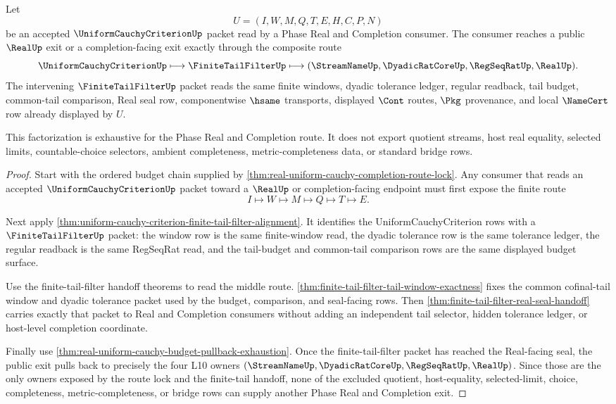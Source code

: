 \begin{theorem}
\label{thm:real-uniform-cauchy-completion-route-lock-factorization}
Let
$$
U=(I,W,M,Q,T,E,H,C,P,N)
$$
be an accepted $\UniformCauchyCriterionUp$ packet read by a Phase Real and
Completion consumer. The consumer reaches a public $\RealUp$ exit or a
completion-facing exit exactly through the composite route
$$
\UniformCauchyCriterionUp
\longmapsto \FiniteTailFilterUp
\longmapsto (\StreamNameUp,\DyadicRatCoreUp,\RegSeqRatUp,\RealUp).
$$
The intervening $\FiniteTailFilterUp$ packet reads the same finite windows,
dyadic tolerance ledger, regular readback, tail budget, common-tail comparison,
Real seal row, componentwise $\hsame$ transports, displayed $\Cont$ routes,
$\Pkg$ provenance, and local $\NameCert$ row already displayed by $U$.

This factorization is exhaustive for the Phase Real and Completion route. It
does not export quotient streams, host real equality, selected limits,
countable-choice selectors, ambient completeness, metric-completeness data, or
standard bridge rows.
\end{theorem}
\begin{proof}
Start with the ordered budget chain supplied by
\autoref{thm:real-uniform-cauchy-completion-route-lock}. Any consumer that
reads an accepted $\UniformCauchyCriterionUp$ packet toward a $\RealUp$ or
completion-facing endpoint must first expose the finite route
$$
I \longmapsto W \longmapsto M \longmapsto Q \longmapsto T \longmapsto E.
$$

Next apply
\autoref{thm:uniform-cauchy-criterion-finite-tail-filter-alignment}. It
identifies the UniformCauchyCriterion rows with a $\FiniteTailFilterUp$ packet:
the window row is the same finite-window read, the dyadic tolerance row is the
same tolerance ledger, the regular readback is the same RegSeqRat read, and the
tail-budget and common-tail comparison rows are the same displayed budget
surface.

Use the finite-tail-filter handoff theorems to read the middle route.
\autoref{thm:finite-tail-filter-tail-window-exactness} fixes the common
cofinal-tail window and dyadic tolerance packet used by the budget, comparison,
and seal-facing rows. Then
\autoref{thm:finite-tail-filter-real-seal-handoff} carries exactly that packet
to Real and Completion consumers without adding an independent tail selector,
hidden tolerance ledger, or host-level completion coordinate.

Finally use
\autoref{thm:real-uniform-cauchy-budget-pullback-exhaustion}. Once the
finite-tail-filter packet has reached the Real-facing seal, the public exit
pulls back to precisely the four L10 owners
$(\StreamNameUp,\DyadicRatCoreUp,\RegSeqRatUp,\RealUp)$. Since those are the
only owners exposed by the route lock and the finite-tail handoff, none of the
excluded quotient, host-equality, selected-limit, choice, completeness,
metric-completeness, or bridge rows can supply another Phase Real and
Completion exit.
\end{proof}

